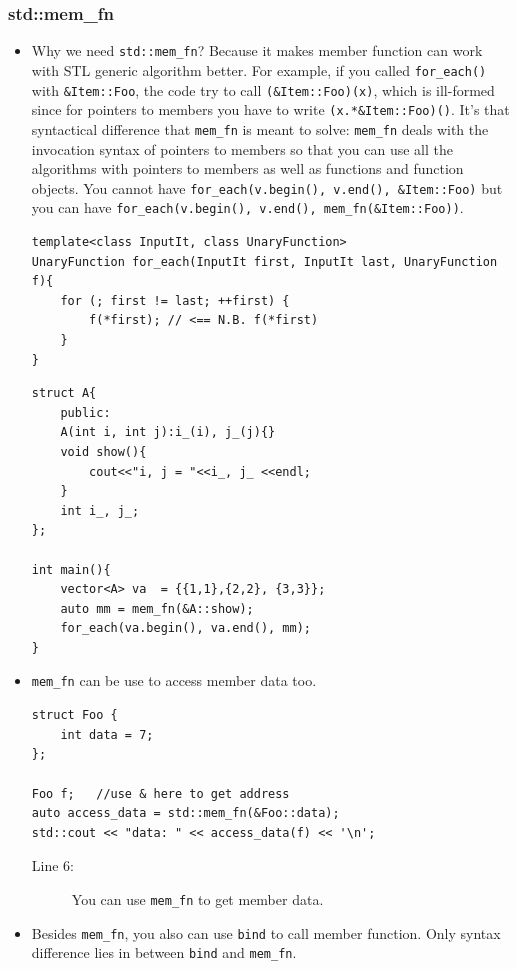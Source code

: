 \documentclass[a4paper,11pt,twoside]{book}
\begin{document}
\subsubsection{std::mem\_fn }
\begin{itemize}
	\item Why we need \texttt{std::mem\_fn}? Because it makes member function can work with STL generic algorithm better. For example, if you called \texttt{for\_each()} with \texttt{\&Item::Foo}, the code try to call \texttt{(\&Item::Foo)(x)}, which is ill-formed since for pointers to members you have to write \texttt{(x.*\&Item::Foo)()}. It's that syntactical difference that \texttt{mem\_fn} is meant to solve: \texttt{mem\_fn} deals with the invocation syntax of pointers to members so that you can use all the algorithms with pointers to members as well as functions and function objects. You cannot have \texttt{for\_each(v.begin(), v.end(), \&Item::Foo)} but you can have \texttt{for\_each(v.begin(), v.end(), mem\_fn(\&Item::Foo))}.
\begin{lstlisting}
template<class InputIt, class UnaryFunction>
UnaryFunction for_each(InputIt first, InputIt last, UnaryFunction f){
	for (; first != last; ++first) {
		f(*first); // <== N.B. f(*first)
	}
}
\end{lstlisting}

\begin{lstlisting}
struct A{
	public:
	A(int i, int j):i_(i), j_(j){}
	void show(){
		cout<<"i, j = "<<i_, j_ <<endl;
	}
	int i_, j_;
};

int main(){
	vector<A> va  = {{1,1},{2,2}, {3,3}};
	auto mm = mem_fn(&A::show);
	for_each(va.begin(), va.end(), mm);
}
\end{lstlisting}

\item \texttt{mem\_fn} can be use to access member data too.
\begin{lstlisting}
struct Foo {
	int data = 7;
};

Foo f;   //use & here to get address
auto access_data = std::mem_fn(&Foo::data);
std::cout << "data: " << access_data(f) << '\n';
\end{lstlisting}
\begin{description}
	\item[Line 6:] You can use \texttt{mem\_fn} to get member data.
\end{description}


\item Besides \texttt{mem\_fn}, you also can use \texttt{bind} to call member function. Only syntax difference lies in between \texttt{bind} and \texttt{mem\_fn}.


\end{itemize}
\end{document}
